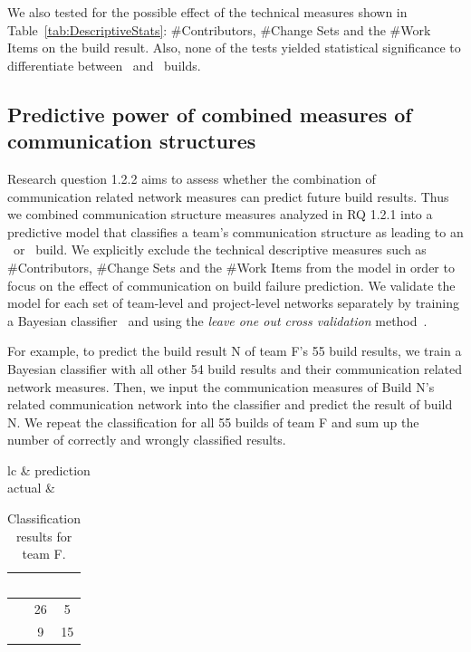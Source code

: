 We also tested for the possible effect of the technical measures shown in
Table~\ref{tab:DescriptiveStats}: \#Contributors, \#Change Sets and the \#Work
Items on the build result. Also, none of the tests yielded statistical
significance to differentiate between \error\ and \ok\ builds.


\subsection{Predictive power of combined measures of communication structures}

Research question 1.2.2 aims to assess whether the combination of
communication related network measures can predict future build results. Thus we
combined communication structure measures analyzed in RQ 1.2.1 into a predictive model
that classifies a team's communication structure as leading to an \error\ or \ok\
build. We explicitly exclude the technical descriptive measures such as
\#Contributors, \#Change Sets and the \#Work Items from the model in order to
focus on the effect of communication on build failure prediction. We validate the
model for each set of team-level and project-level networks separately by
training a Bayesian classifier~\cite{Hastie:2003ys} and using the \emph{leave one
out cross validation} method~\cite{Hastie:2003ys}.

For example, to predict the build result N of team F's 55 build results, we train
a Bayesian classifier with all other 54 build results and their communication
related network measures. Then, we input the communication measures of Build N's
related communication network into the classifier and predict the result of build
N. We repeat the classification for all 55 builds of team F and sum up the number
of correctly and wrongly classified results.

\begin{table}[t] \centering\small
\begin{tabular}{lc}
& prediction \\
actual & 
\begin{tabular}{r|c|c|}
& \ok\ & \error\ \\\hline
\ok\ & 26 & 5 \\\hline
\error\ & 9 & 15 \\\hline
\end{tabular}
\end{tabular}
\caption{Classification results for team F.}
\label{tab:cont}
\end{table}

